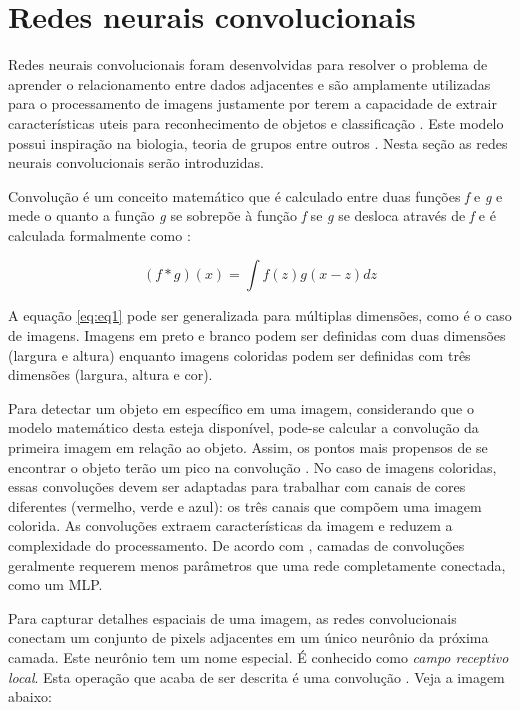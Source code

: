 \section{Redes neurais convolucionais}
\label{sec:cnn}

Redes neurais convolucionais foram desenvolvidas para resolver o problema de aprender o relacionamento entre dados adjacentes e são amplamente utilizadas para o processamento de imagens justamente por terem a capacidade de extrair características uteis para reconhecimento de objetos e classificação \cite{zhang_dive_2021}. Este modelo possui inspiração na biologia, teoria de grupos entre outros \cite{zhang_dive_2021}. Nesta seção as redes neurais convolucionais serão introduzidas.

Convolução é um conceito matemático que é calculado entre duas funções \textit{f} e \textit{g} e mede o quanto a função \textit{g} se sobrepõe à função \textit{f} se \textit{g} se desloca através de \textit{f} e é calculada formalmente como \cite{wikipedia_convolucao_2020, weisstein_convolution_2003, zhang_dive_2021}:

\begin{equation}
    (f * g)(x) = \int f(z)g(x-z)dz
    \label{eq:eq1}
\end{equation}

A equação \ref{eq:eq1} pode ser generalizada para múltiplas dimensões, como é o caso de imagens. Imagens em preto e branco podem ser definidas com duas dimensões (largura e altura) enquanto imagens coloridas podem ser definidas com três dimensões (largura, altura e cor). 

Para detectar um objeto em específico em uma imagem, considerando que o modelo matemático desta esteja disponível, pode-se calcular a convolução da primeira imagem em relação ao objeto. Assim, os pontos mais propensos de se encontrar o objeto terão um pico na convolução \cite{zhang_dive_2021}. No caso de imagens coloridas, essas convoluções devem ser adaptadas para trabalhar com canais de cores diferentes (vermelho, verde e azul): os três canais que compõem uma imagem colorida. As convoluções extraem características da imagem e reduzem a complexidade do processamento. De acordo com \cite{zhang_dive_2021}, camadas de convoluções geralmente requerem menos parâmetros que uma rede completamente conectada, como um MLP.  

Para capturar detalhes espaciais de uma imagem, as redes convolucionais conectam um conjunto de pixels adjacentes em um único neurônio da próxima camada. Este neurônio tem um nome especial. É conhecido como \textit{campo receptivo local}. Esta operação que acaba de ser descrita é uma convolução \cite{gulli_deep_2019}. Veja a imagem abaixo:

